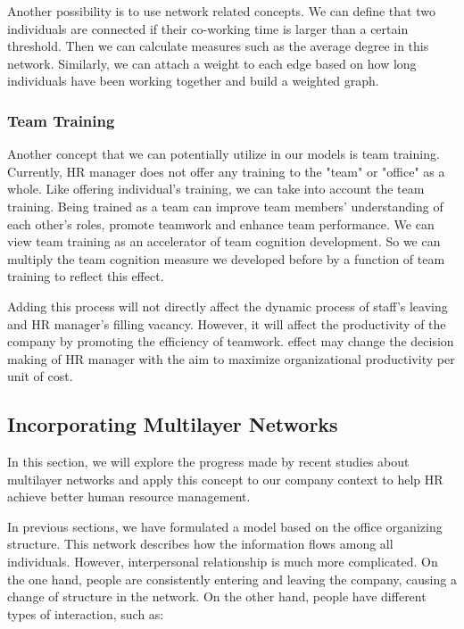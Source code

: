 \documentclass[tcn = 37075, sheet = false, abstract = false]{mcmthesis}
\begin{document}
	Another possibility is to use network related concepts. We can define that two individuals are connected if their co-working time is larger than a certain threshold. Then we can calculate measures such as the average degree in this network. Similarly, we can attach a weight to each edge based on how long individuals have been working together and build a weighted graph.
	
	\subsubsection{Team Training}
	
	Another concept that we can potentially utilize in our models is team training. Currently, HR manager does not offer any training to the "team" or "office" as a whole. Like offering individual's training, we can take into account the team training. Being trained as a team can improve team members' understanding of each other's roles, promote teamwork and enhance team performance\cite{cooke2004advances}. We can view team training as an accelerator of team cognition development. So we can multiply the team cognition measure we developed before by a function of team training to reflect this effect. 
	
	Adding this process will not directly affect the dynamic process of staff's leaving and HR manager's filling vacancy. However, it will affect the productivity of the company by promoting the efficiency of teamwork.  effect may change the decision making of HR manager with the aim to maximize organizational productivity per unit of cost. 
	
	\subsection{Incorporating Multilayer Networks }
	
	In this section, we will explore the progress made by recent studies about multilayer networks\cite{kivela2014multilayer} and apply this concept to our company context to help HR achieve better human resource management.
	
	In previous sections, we have formulated a model based on the office organizing structure. This network describes how the information flows among all individuals. However,  interpersonal relationship is much more complicated. On the one hand, people are consistently entering and leaving the company, causing a change of structure in the network. On the other hand, people have different types of interaction, such as:
	
\end{document}

